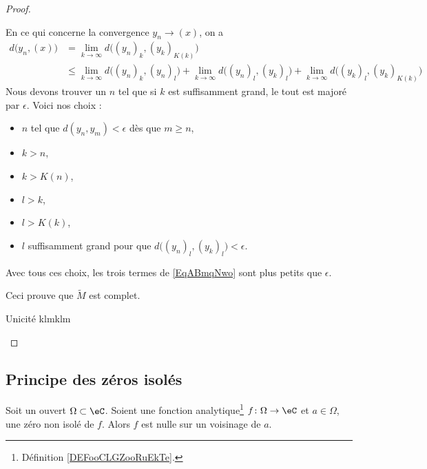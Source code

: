 \begin{proof}
\begin{subproof}
\begin{subproof}
			En ce qui concerne la convergence \( y_n\to (x)\), on a
			\begin{subequations}
				\begin{align}
					d\big( y_n,(x) \big) & =\lim_{k\to \infty} d\big( (y_n)_k,(y_k)_{K(k)} \big)                                                                                                                            \\
					                     & \leq \lim_{k\to \infty} d\big( (y_n)_k,(y_n)_l \big)+\lim_{k\to \infty} d\big( (y_n)_l,(y_k)_{l} \big)+\lim_{k\to \infty} d\big( (y_k)_l,(y_k)_{K(k)} \big)    \label{EqABmqNwo}
				\end{align}
			\end{subequations}
			Nous devons trouver un \( n\) tel que si \( k\) est suffisamment grand, le tout est majoré par \( \epsilon\). Voici nos choix :
			\begin{itemize}
				\item \( n\) tel que \( d(y_n,y_m)<\epsilon\) dès que \( m\geq n\),
				\item \( k>n\),
				\item \( k>K(n)\),
				\item \( l>k\),
				\item \( l>K(k)\),
				\item \( l\) suffisamment grand pour que \( d\big( (y_n)_l,(y_k)_l \big)<\epsilon\).
			\end{itemize}
			Avec tous ces choix, les trois termes de \eqref{EqABmqNwo} sont plus petits que \( \epsilon\).

			Ceci prouve que \( \tilde M\) est complet.
		\end{subproof}
		\item[Unicité]
		klmklm
	\end{subproof}
\end{proof}

\subsection{Principe des zéros isolés}

\begin{theorem}     \label{ThoukDPBX}
	Soit un ouvert \( \Omega\subset \eC\). Soient une fonction analytique\footnote{Définition \ref{DEFooCLGZooRuEkTe}.} \(f\colon \Omega\to \eC \) et \( a\in \Omega\), une zéro non isolé de \( f\). Alors \( f\) est nulle sur un voisinage de \( a\).
\end{theorem}


